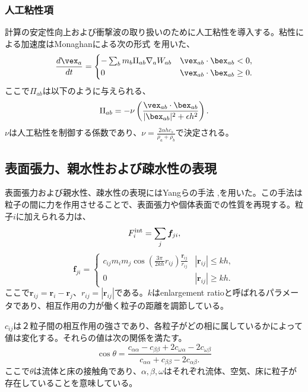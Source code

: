 \documentclass[]{jsarticle}
\begin{document}
\subsubsection{人工粘性項}
計算の安定性向上および衝撃波の取り扱いのために人工粘性を導入する。粘性による加速度はMonaghanによる次の形式 \cite{Monaghan2005}を用いた、
\begin{equation}
\frac{d\vex_a}{dt}=\begin{cases}
  -\sum_bm_b\Pi_{ab}\nabla_aW_{ab} & \vex_{ab}\cdot\bex_{ab}<0, \\
  0 & \vex_{ab}\cdot\bex_{ab}\geq0.
\end{cases}
\end{equation}
ここで$\Pi_{ab}$は以下のように与えられる、
\begin{equation}
\Pi_{ab}=-\nu\left(\frac{\vex_{ab}\cdot\bex_{ab}}{|\bex_{ab}|^2+\epsilon h^2}\right).
\end{equation}
$\nu$は人工粘性を制御する係数であり、$\nu=\frac{2\alpha h c_s}{\rho_a+\rho_b}$で決定される。

\subsection{表面張力、親水性および疎水性の表現}
表面張力および親水性、疎水性の表現にはYangらの手法 \cite{Yang2016},\cite{Yang2017}を用いた。この手法は粒子の間に力を作用させることで、表面張力や個体表面での性質を再現する。粒子$i$に加えられる力は、
\begin{equation}
F^{\rm{int}}_i=\sum_{j} \bm{f}_{ji},
\end{equation}
\begin{equation}
  \bm{f}_{ji}=\begin{cases}
    c_{ij}m_im_j\cos\left(\frac{3\pi}{2kh}r_{ij}\right)\frac{\bm{r}_{ij}}{r_{ij}} & \text{$|\bm{r}_{ij}|\leq kh,$}\\
    0 & \text{$|\bm{r}_{ij}|\geq kh.$}
\end{cases}
\end{equation}
ここで$\bm{r}_{ij}=\bm{r}_i-\bm{r}_{j}$、$r_{ij}=|\bm{r}_{ij}|$である。$k$はenlargement ratioと呼ばれるパラメータであり、相互作用の力が働く粒子の距離を調節している。

$c_{ij}$は２粒子間の相互作用の強さであり、各粒子がどの相に属しているかによって値は変化する。それらの値は次の関係を満たす。
\begin{equation}
\cos\theta=\frac{c_{\alpha\alpha}-c_{\beta\beta}+2c_{\omega\alpha}-2c_{\omega\beta}}{c_{\alpha\alpha} +c_{\beta\beta} -2c_{\alpha\beta}.}
\end{equation}
ここで$\theta$は流体と床の接触角であり、$\alpha,\beta,\omega$はそれぞれ流体、空気、床に粒子が存在していることを意味している。
\end{document}
